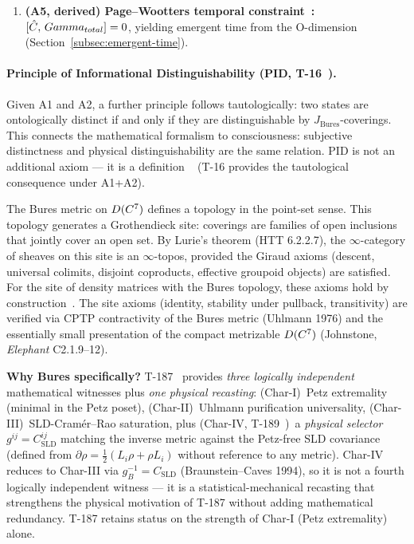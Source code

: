 \begin{enumerate}[leftmargin=2em, start=5]
  \item \textbf{(A5, derived) Page--Wootters temporal constraint~\cite{page1983}:}
        $[\hat{C},\, Gamma_{total}] = 0$, yielding emergent time from the
        O-dimension (Section~\ref{subsec:emergent-time}).
\end{enumerate}

\paragraph{Principle of Informational Distinguishability (PID, T-16~).}
Given A1 and A2, a further principle follows tautologically: two states are ontologically
distinct if and only if they are distinguishable by $J_{\mathrm{Bures}}$-coverings. This
connects the mathematical formalism to consciousness: subjective distinctness and physical
distinguishability are the same relation. PID is not an additional axiom --- it is a
definition ~ (T-16 provides the tautological consequence under A1+A2).

The Bures metric on $D(C^7)$ defines a topology in the point-set sense. This topology generates a Grothendieck site: coverings are families of open inclusions that jointly cover an open set. By Lurie's theorem (HTT 6.2.2.7), the $\infty$-category of sheaves on this site is an $\infty$-topos, provided the Giraud axioms (descent, universal colimits, disjoint coproducts, effective groupoid objects) are satisfied. For the site of density matrices with the Bures topology, these axioms hold by construction~\cite{lurie2009}. The site axioms (identity, stability under pullback, transitivity) are verified via CPTP contractivity of the Bures metric (Uhlmann 1976) and the essentially small presentation of the compact metrizable $D(C^7)$ (Johnstone, \emph{Elephant} C2.1.9--12).

\textbf{Why Bures specifically?} T-187~ provides \emph{three logically
independent} mathematical witnesses plus \emph{one physical recasting}: (Char-I)~Petz
extremality (minimal in the Petz poset), (Char-II)~Uhlmann purification universality,
(Char-III)~SLD-Cram\'{e}r--Rao saturation, plus (Char-IV, T-189~)~a
\emph{physical selector} $g^{ij} = C^{ij}_{\mathrm{SLD}}$ matching the inverse metric
against the Petz-free SLD covariance (defined from
$\partial\rho = \tfrac12(L_i\rho + \rho L_i)$ without reference to any metric). Char-IV
reduces to Char-III via $g_B^{-1} = C_{\mathrm{SLD}}$ (Braunstein--Caves 1994), so it is
not a fourth logically independent witness --- it is a statistical-mechanical recasting
that strengthens the physical motivation of T-187 without adding mathematical redundancy.
T-187 retains status  on the strength of Char-I (Petz extremality) alone.

